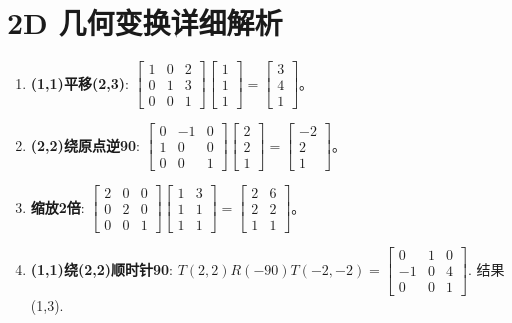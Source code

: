 \documentclass[UTF8]{ctexart}
\begin{document}
\section{2D 几何变换详细解析}
\begin{enumerate}
    \item \textbf{(1,1)平移(2,3)}: $\begin{bmatrix} 1&0&2 \\ 0&1&3 \\ 0&0&1 \end{bmatrix} \begin{bmatrix} 1\\1\\1 \end{bmatrix} = \begin{bmatrix} 3\\4\\1 \end{bmatrix}$。
    \item \textbf{(2,2)绕原点逆90}: $\begin{bmatrix} 0&-1&0 \\ 1&0&0 \\ 0&0&1 \end{bmatrix} \begin{bmatrix} 2\\2\\1 \end{bmatrix} = \begin{bmatrix} -2\\2\\1 \end{bmatrix}$。
    \item \textbf{缩放2倍}: $\begin{bmatrix} 2&0&0 \\ 0&2&0 \\ 0&0&1 \end{bmatrix} \begin{bmatrix} 1&3 \\ 1&1 \\ 1&1 \end{bmatrix} = \begin{bmatrix} 2&6 \\ 2&2 \\ 1&1 \end{bmatrix}$。
    \item \textbf{(1,1)绕(2,2)顺时针90}: $T(2,2)R(-90)T(-2,-2) = \begin{bmatrix} 0&1&0 \\ -1&0&4 \\ 0&0&1 \end{bmatrix}$. 结果 (1,3).

\end{enumerate}
\end{document}
